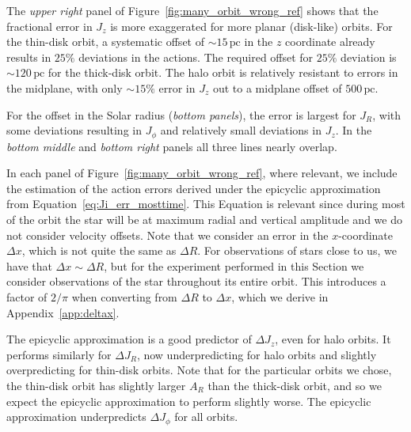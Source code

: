 \documentclass[twocolumn]{aastex62}
\newcommand{\pc}{\text{pc}}
\begin{document}
The {\em upper right} panel of Figure~\ref{fig:many_orbit_wrong_ref} shows
that the fractional error in $J_z$ is more exaggerated for more planar
(disk-like) orbits. For the thin-disk orbit, a systematic offset of
$\sim15\,\pc$ in the $z$ coordinate already results in $25\%$ deviations in
the actions. The required offset for $25\%$ deviation is $\sim120\,\pc$ for
the thick-disk orbit. The halo orbit is relatively resistant to errors in the
midplane, with only $\sim15\%$ error in $J_z$ out to a midplane offset of
$500\,\pc$.

For the offset in the Solar radius ({\em bottom panels}), the error is largest
for $J_R$, with some deviations resulting in $J_{\phi}$ and relatively small
deviations in $J_z$. In the {\em bottom middle} and {\em bottom right} panels
all three lines nearly overlap.

In each panel of Figure~\ref{fig:many_orbit_wrong_ref}, where relevant, we
include the estimation of the action errors derived under the epicyclic
approximation from Equation~\eqref{eq:Ji_err_mosttime}. This Equation is
relevant since during most of the orbit the star will be at maximum radial and
vertical amplitude and we do not consider velocity offsets. Note that we
consider an error in the $x$-coordinate $\Delta x$, which is not quite the
same as $\Delta R$. For observations of stars close to us, we have that
$\Delta x \sim \Delta R$, but for the experiment performed in this Section we
consider observations of the star throughout its entire orbit. This introduces
a factor of $2/\pi$ when converting from $\Delta R$ to $\Delta x$, which we
derive in Appendix~\ref{app:deltax}.

The epicyclic approximation is a good predictor of $\Delta J_z$, even for halo
orbits. It performs similarly for $\Delta J_R$, now underpredicting for halo orbits
and slightly overpredicting for thin-disk orbits. Note that for the particular
orbits we chose, the thin-disk orbit has slightly larger $A_R$ than the
thick-disk orbit, and so we expect the epicyclic approximation to perform
slightly worse. The epicyclic approximation underpredicts $\Delta J_{\phi}$ for all
orbits.
\end{document}
